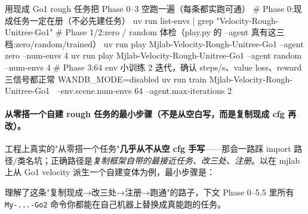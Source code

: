 \begin{codebox}[bash]{用现成 Go1 rough 任务把 Phase 0--3 空跑一遍（每条都实跑可通）}
# Phase 0:现成任务一定在册（不必先建任务）
uv run list-envs | grep "Velocity-Rough-Unitree-Go1"
# Phase 1/2:zero / random 体检（play.py 的 --agent 真有这三档:zero/random/trained）
uv run play Mjlab-Velocity-Rough-Unitree-Go1 --agent zero   --num-envs 4
uv run play Mjlab-Velocity-Rough-Unitree-Go1 --agent random --num-envs 4
# Phase 3:64 env 小训练 2 迭代，确认 steps/s、value loss、reward 三信号都正常
WANDB_MODE=disabled uv run train Mjlab-Velocity-Rough-Unitree-Go1 \
  --env.scene.num-envs 64 --agent.max-iterations 2
\end{codebox}

\paragraph{从零搭一个自建 rough 任务的最小步骤（不是从空白写，而是复制现成 cfg 再改）。}工程上真实的"从零搭一个任务"\textbf{几乎从不从空 cfg 手写}——那会一路踩 import 路径/类名坑；正确路径是\emph{复制框架自带的最接近任务、改三处、注册}。以在 mjlab 上从 Go1 velocity 派生一个自建变体为例，最小步骤是：


理解了这条"复制现成→改三处→注册→跑通"的路子，下文 Phase 0--5.5 里所有 \verb|My-...-Go2| 命令你都能在自己机器上替换成真能跑的任务。

